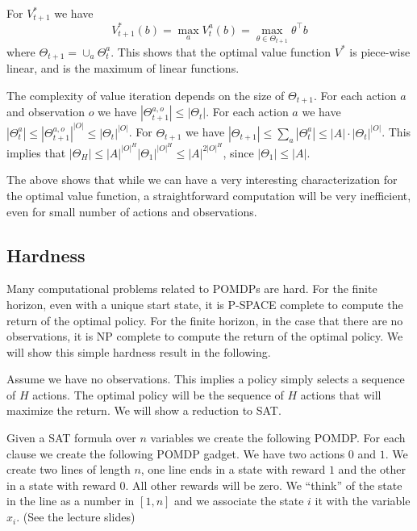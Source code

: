 For $V_{t+1}^*$ we have
\[
V^*_{t+1}(b)=\max_a V_t^a(b)=\max_{\theta\in\Theta_{t+1}}
\theta^\top b
\]
where $\Theta_{t+1}=\cup_a \Theta^a_t$.
%
This shows that the optimal value function $V^*$ is piece-wise linear, and is the maximum of linear functions.

The complexity of value iteration depends on the size of $\Theta_{t+1}$. For each action $a$ and observation $o$ we have $|\Theta^{a,o}_{t+1}|\leq |\Theta_t|$. For each action $a$ we have $|\Theta^a_t|\leq {|\Theta^{a,o}_{t+1}|}^{|O|}\leq {|\Theta_t|}^{|O|}$. For $\Theta_{t+1}$ we have $|\Theta_{t+1}|\leq \sum_a |\Theta_t^a|\leq |A|\cdot |\Theta_t|^{|O|}$.
This implies that $|\Theta_H|\leq |A|^{|O|^H}|\Theta_1|^{|O|^H} \leq |A|^{2|O|^H}$, since $|\Theta_1|\leq |A|$.

The above shows that while we can have a very interesting characterization for the optimal value function, a straightforward computation will be very inefficient, even for small number of actions and observations.  




\subsection{Hardness}

Many computational problems related to POMDPs are hard. For the finite horizon, even with a unique start state, it is P-SPACE complete to compute the return of the optimal policy. For the finite horizon, in the case that there are no observations, it is NP complete to compute the return of the optimal policy. We
will show this simple hardness result in the following.

Assume we have no observations. This implies a policy simply selects a sequence of $H$ actions. The optimal policy will be the sequence of $H$ actions that will maximize the return. We will show a reduction to SAT.

Given a SAT formula over $n$ variables we create the following POMDP. For each clause we create the following POMDP gadget. We have two actions $0$ and $1$. We create two lines of length $n$, one line ends in a state with reward $1$ and the other in a state with reward $0$. All other rewards will be zero. We ``think'' of the state in the line as a number in $[1,n]$ and we associate the state $i$ it with the variable $x_i$. (See the lecture slides)


